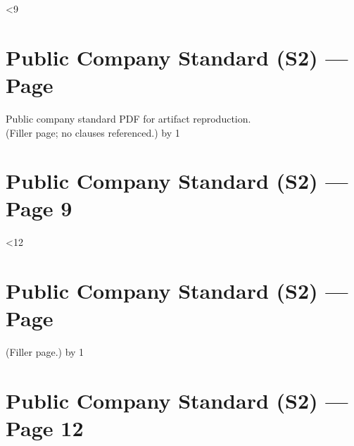 \documentclass[a4paper,11pt]{article}
\begin{document}
\newcount\p
{}
\loop
  \ifnum\p<9
    \section*{Public Company Standard (S2) --- Page \the\p}
    Public company standard PDF for artifact reproduction.\\
    (Filler page; no clauses referenced.)
    \vfill
    \newpage
    \advance\p by 1
\repeat

\section*{Public Company Standard (S2) --- Page 9}
\noindent
{}
\newpage

\loop
  \ifnum\p<12
    \section*{Public Company Standard (S2) --- Page \the\p}
    (Filler page.)
    \vfill
    \newpage
    \advance\p by 1
\repeat

\section*{Public Company Standard (S2) --- Page 12}
\noindent
{}
\end{document}
